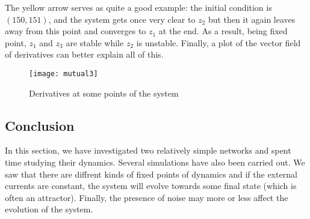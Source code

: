 The yellow arrow serves as quite a good example: the initial condition is 
$(150, 151)$, and the system gets once very clear to $z_2$ but then it again
leaves away from this point and converges to $z_1$ at the end. As a result,
being fixed point, $z_1$ and $z_3$ are stable while $z_2$ is unstable. 
Finally, a plot of the vector field of derivatives can better 
explain all of this.

\begin{figure}[H]
  \centering
  \texttt{[image: mutual3]}
  \caption
    {Derivatives at some points of the system}
\end{figure}

\subsection{Conclusion}
In this section, we have investigated two relatively simple networks and spent
time studying their dynamics. Several simulations have also been carried out.
We saw that there are diffrent kinds of fixed points of dynamics and if the
external currents are constant, the system will evolve towards some final 
state (which is often an attractor). Finally, the presence of noise may more
or less affect the evolution of the system.

